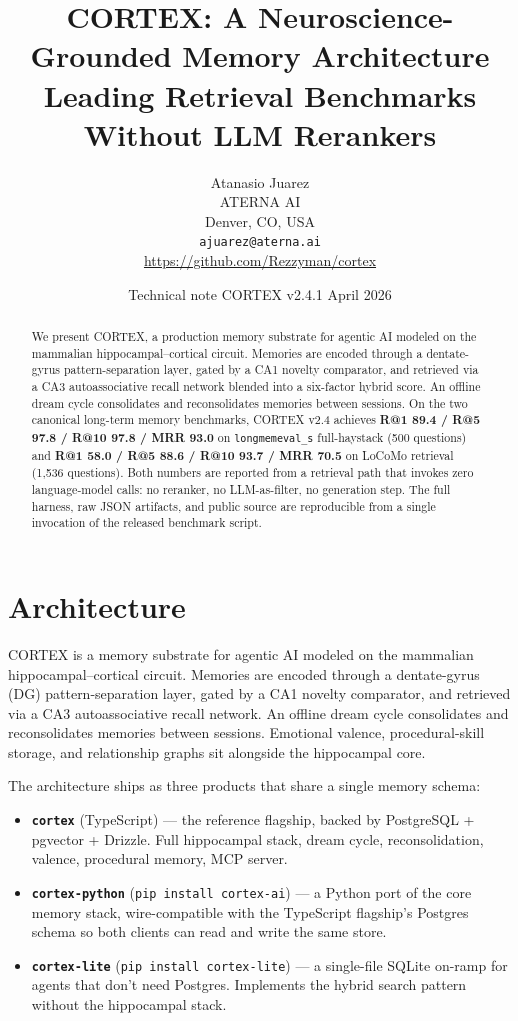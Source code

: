 \documentclass{article}
\title{%
  CORTEX: A Neuroscience-Grounded Memory Architecture \\
  Leading Retrieval Benchmarks Without LLM Rerankers
}
\author{%
  Atanasio Juarez \\
  ATERNA AI \\
  Denver, CO, USA \\
  \texttt{ajuarez@aterna.ai} \\
  \url{https://github.com/Rezzyman/cortex}
}
\date{Technical note \textperiodcentered{} CORTEX v2.4.1 \textperiodcentered{} April 2026}
\begin{document}
\maketitle

\begin{abstract}
We present CORTEX, a production memory substrate for agentic AI
modeled on the mammalian hippocampal--cortical circuit. Memories are
encoded through a dentate-gyrus pattern-separation layer, gated by a
CA1 novelty comparator, and retrieved via a CA3 autoassociative recall
network blended into a six-factor hybrid score. An offline dream cycle
consolidates and reconsolidates memories between sessions. On the two
canonical long-term memory benchmarks, CORTEX v2.4 achieves
\textbf{R@1 89.4 / R@5 97.8 / R@10 97.8 / MRR 93.0} on
\texttt{longmemeval\_s} full-haystack (500 questions) and
\textbf{R@1 58.0 / R@5 88.6 / R@10 93.7 / MRR 70.5} on LoCoMo retrieval
(1{,}536 questions). Both numbers are reported from a retrieval path
that invokes zero language-model calls: no reranker, no LLM-as-filter,
no generation step. The full harness, raw JSON artifacts, and public
source are reproducible from a single invocation of the released
benchmark script.
\end{abstract}

\section{Architecture}

CORTEX is a memory substrate for agentic AI modeled on the mammalian
hippocampal--cortical circuit. Memories are encoded through a
dentate-gyrus (DG) pattern-separation layer, gated by a CA1 novelty
comparator, and retrieved via a CA3 autoassociative recall network. An
offline dream cycle consolidates and reconsolidates memories between
sessions. Emotional valence, procedural-skill storage, and relationship
graphs sit alongside the hippocampal core.

The architecture ships as three products that share a single memory
schema:

\begin{itemize}
  \item \textbf{\texttt{cortex}} (TypeScript) --- the reference flagship,
        backed by PostgreSQL + pgvector + Drizzle. Full hippocampal
        stack, dream cycle, reconsolidation, valence, procedural memory,
        MCP server.
  \item \textbf{\texttt{cortex-python}} (\texttt{pip install cortex-ai})
        --- a Python port of the core memory stack, wire-compatible
        with the TypeScript flagship's Postgres schema so both clients
        can read and write the same store.
  \item \textbf{\texttt{cortex-lite}} (\texttt{pip install cortex-lite})
        --- a single-file SQLite on-ramp for agents that don't need
        Postgres. Implements the hybrid search pattern without the
        hippocampal stack.
\end{itemize}
\end{document}
